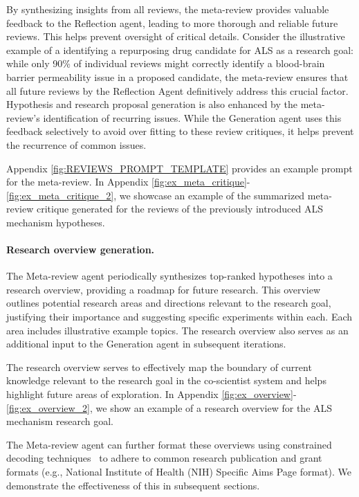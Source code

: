 By synthesizing insights from all reviews, the meta-review provides valuable feedback to the Reflection agent, leading to more thorough and reliable future reviews.  This helps prevent oversight of critical details. Consider the illustrative example of a identifying a repurposing drug candidate for ALS as a research goal: while only 90\% of individual reviews might correctly identify a blood-brain barrier permeability issue in a proposed candidate, the meta-review ensures that all future reviews by the Reflection Agent definitively address this crucial factor. Hypothesis and research proposal generation is also enhanced by the meta-review's identification of recurring issues. While the Generation agent uses this feedback selectively to avoid over fitting to these review critiques, it helps prevent the recurrence of common issues.

Appendix \cref{fig:REVIEWS_PROMPT_TEMPLATE} provides an example prompt for the meta-review. In Appendix \cref{fig:ex_meta_critique}-\ref{fig:ex_meta_critique_2}, we showcase an example of the summarized meta-review critique generated for the reviews of the previously introduced ALS mechanism hypotheses.

\paragraph{Research overview generation.}
The Meta-review agent periodically synthesizes top-ranked hypotheses into a research overview, providing a roadmap for future research. This overview outlines potential research areas and directions relevant to the research goal, justifying their importance and suggesting specific experiments within each.  Each area includes illustrative example topics. The research overview also serves as an additional input to the Generation agent in subsequent iterations.

The research overview serves to effectively map the boundary of current knowledge relevant to the research goal in the co-scientist system and helps highlight future areas of exploration. In Appendix \cref{fig:ex_overview}-\ref{fig:ex_overview_2}, we show an example of a research overview for the ALS mechanism research goal.

The Meta-review agent can further format these overviews using constrained decoding techniques~\citep{post2018fast} to adhere to common research publication and grant formats (e.g., National Institute of Health (NIH) Specific Aims Page format). We demonstrate the effectiveness of this in subsequent sections.

